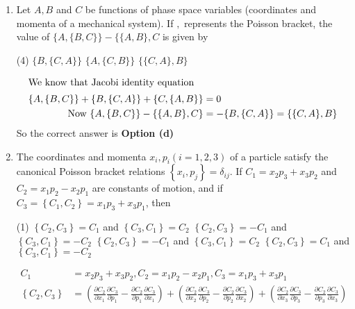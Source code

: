 \begin{enumerate}
\begin{answer}
\end{answer}
	\item  Let $A, B$ and $C$ be functions of phase space variables (coordinates and momenta of a mechanical system). If ${,}$ represents the Poisson bracket, the value of $\{A,\{B, C\}\}-\{\{A, B\}, C$ is given by
	{}
	\begin{tasks}(4)
		\task[\textbf{b.}]$\{B,\{C, A\}\}$
		\task[\textbf{c.}]$\{A,\{C, B\}\}$
		\task[\textbf{d.}] $\{\{C, A\}, B\}$
	\end{tasks}
\begin{answer}
	\begin{align*}
	\intertext{We know that Jacobi identity equation}
	\{A,\{B, C\}\}+\{B,\{C, A\}\}+\{C,\{A, B\}\}&=0\\
	\text{	Now }\{A,\{B, C\}\}-\{\{A, B\}, C\}&=-\{B,\{C, A\}\}=\{\{C, A\}, B\}
	\end{align*}
	So the correct answer is \textbf{Option (d)}
\end{answer}
	\item  The coordinates and momenta $x_{i}, p_{i}(i=1,2,3)$ of a particle satisfy the canonical Poisson bracket relations $\left\{x_{i}, p_{j}\right\}=\delta_{i j}$. If $C_{1}=x_{2} p_{3}+x_{3} p_{2}$ and $C_{2}=x_{1} p_{2}-x_{2} p_{1}$ are constants of motion, and if $C_{3}=\left\{C_{1}, C_{2}\right\}=x_{1} p_{3}+x_{3} p_{1}$, then
	\begin{tasks}(1)
		\task[\textbf{a.}]$\left\{C_{2}, C_{3}\right\}=C_{1}$ and $\left\{C_{3}, C_{1}\right\}=C_{2}$
		\task[\textbf{b.}]$\left\{C_{2}, C_{3}\right\}=-C_{1}$ and $\left\{C_{3}, C_{1}\right\}=-C_{2}$
		\task[\textbf{c.}]$\left\{C_{2}, C_{3}\right\}=-C_{1}$ and $\left\{C_{3}, C_{1}\right\}=C_{2}$
		\task[\textbf{d.}] $\left\{C_{2}, C_{3}\right\}=C_{1}$ and $\left\{C_{3}, C_{1}\right\}=-C_{2}$
	\end{tasks}
\begin{answer}
	\begin{align*}
	C_{1}&=x_{2} p_{3}+x_{3} p_{2}, C_{2}=x_{1} p_{2}-x_{2} p_{1}, C_{3}=x_{1} p_{3}+x_{3} p_{1}\\
	\left\{C_{2}, C_{3}\right\}&=\left(\frac{\partial C_{2}}{\partial x_{1}} \frac{\partial C_{3}}{\partial p_{1}}-\frac{\partial C_{2}}{\partial p_{1}} \frac{\partial C_{3}}{\partial x_{1}}\right)+\left(\frac{\partial C_{2}}{\partial x_{2}} \frac{\partial C_{3}}{\partial p_{2}}-\frac{\partial C_{2}}{\partial p_{2}} \frac{\partial C_{3}}{\partial x_{2}}\right)+\left(\frac{\partial C_{2}}{\partial x_{3}} \frac{\partial C_{3}}{\partial p_{3}}-\frac{\partial C_{2}}{\partial p_{3}} \frac{\partial C_{3}}{\partial x_{3}}\right)\\

\end{align*}
\end{answer}
\end{enumerate}
